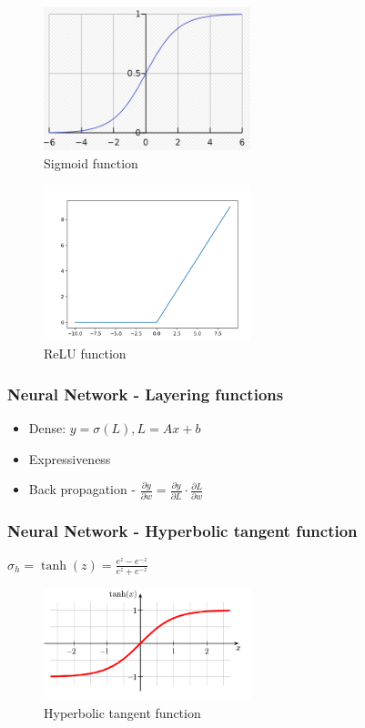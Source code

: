 \documentclass{article}
\begin{document}
\begin{figure}[H]\centering\includegraphics[width=6cm]{sigmoid.png}\caption{Sigmoid function}\end{figure}
\begin{figure}[H]\centering\includegraphics[width=6cm]{RELU.png}\caption{ReLU function}\end{figure}

\newpage
\subsubsection{Neural Network - Layering functions}

\begin{itemize}
	\item Dense: $y = \sigma(L), L = Ax+b$
	\item Expressiveness 
	\item Back propagation - $\frac{\partial y}{ \partial w} =  \frac{\partial y}{ \partial L} \cdot \frac{\partial L}{ \partial w}$
\end{itemize}


\subsubsection{Neural Network - Hyperbolic tangent  function}
$\sigma_h = \tanh(z) = \frac{e^z-e^{-z}}{e^z+e^{-z}}$
\begin{figure}[H]\centering\includegraphics[width=6cm]{tanh.png}\caption{Hyperbolic tangent function}\end{figure}
\end{document}
